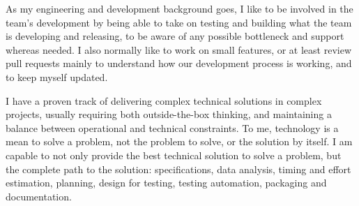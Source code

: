 \documentclass[11pt, a4paper]{awesome-cv}
\begin{document}
\begin{cvletter}
As my engineering and development background goes, I like to be involved in the team's development by being able to take on testing and building what the team is developing and releasing, to be aware of any possible bottleneck and support whereas needed.  I also normally like to work on small features, or at least review pull requests mainly to understand how our development process is working, and to keep myself updated.

I have a proven track of delivering complex technical solutions in complex projects, usually requiring both outside-the-box thinking, and maintaining a balance between operational and technical constraints.  To me, technology is a mean to solve a problem, not the problem to solve, or the solution by itself.  I am capable to not only provide the best technical solution to solve a problem, but the complete path to the solution: specifications, data analysis, timing and effort estimation, planning, design for testing, testing automation, packaging and documentation.

\end{cvletter}


\makeletterclosing
\end{document}
